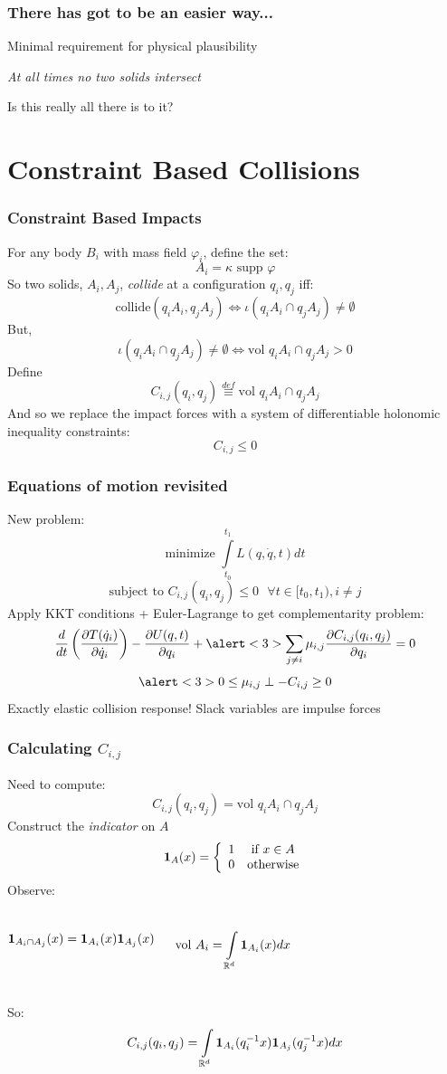 \documentclass{beamer}
\begin{document}
\begin{frame}
\frametitle{There has got to be an easier way...}
\pause
Minimal requirement for physical plausibility
\vskip7pt
\begin{center}
\emph{At all times no two solids intersect}
\end{center}
\pause
\vskip15pt
Is this really all there is to it?

\end{frame}

\section{Constraint Based Collisions}
\begin{frame}
\frametitle{Constraint Based Impacts}
For any body $B_i$ with mass field $\varphi_i$, define the set:
\[ A_i = \kappa \text{ supp } \varphi \]
\pause
So two solids, $A_i, A_j$, \emph{collide} at a configuration $q_i, q_j$ iff:
\[ \text{collide}(q_i A_i, q_j A_j) \Leftrightarrow \iota (q_i A_i \cap q_j A_j) \neq \emptyset \]
\pause
But,
\[ \iota ( q_i A_i \cap q_j A_j ) \neq \emptyset \Leftrightarrow \text{vol } q_i A_i \cap q_j A_j > 0 \]
\pause
Define
\[ C_{i,j}(q_i, q_j) \stackrel{def}{\equiv} \text{vol } q_i A_i \cap q_j A_j \]
And so we replace the impact forces with a system of differentiable holonomic inequality constraints:
\[ C_{i,j} \leq 0 \]
\end{frame}

\begin{frame}
\frametitle{Equations of motion revisited}
New problem:
\[ \text{minimize } \int \limits_{t_0}^{t_1} L(q, \dot{q}, t) dt \]
\[ \text{subject to } C_{i,j}(q_i, q_j) \leq 0 \:\:\: \forall t \in [t_0, t_1), i \neq j \]
\pause
Apply KKT conditions + Euler-Lagrange to get complementarity problem:
\[ \frac{d}{dt} \left( \frac{\partial T(\dot{q}_i)}{\partial \dot{q}_i} \right)
- \frac{\partial U(q, t)}{\partial q_i} + \alert<3>{\sum \limits_{j \neq i} \mu_{i,j} \frac{ \partial C_{i,j}(q_i, q_j)}{ \partial{q_i} }} = 0 \]
\[ \alert<3>{0 \leq \mu_{i,j} \perp -C_{i,j} \geq 0} \]
\pause
Exactly elastic collision response!
\vskip5pt
Slack variables are impulse forces
\end{frame}

\begin{frame}
\frametitle{Calculating $C_{i,j}$}
Need to compute:
\[ C_{i,j}(q_i, q_j) = \text{vol } q_i A_i \cap q_j A_j \]
\pause
Construct the \emph{indicator} on $A$
\[ {\bf 1}_{A}(x) = \left \{ \begin{array}{cc}
1 & \text{if } x \in A \\
0 & \text{otherwise}
\end{array} \right. \]
\pause
Observe:
\begin{columns}
		{\centering
		\[ {\bf 1}_{A_i \cap A_j}(x) = {\bf 1}_{A_i}(x) {\bf 1}_{A_j}(x)  \]
		}
	
		{\centering
		\[ \text{vol } A_i = \int \limits_{\mathbb{R}^d} {\bf 1}_{A_i}(x) dx \]
		}
\end{columns}
\pause
So:
\[ C_{i,j}(q_i, q_j) = \int \limits_{\mathbb{R}^d} {\bf 1}_{A_i}(q_i^{-1} x) {\bf 1}_{A_j}(q_j^{-1} x) dx \]
\end{frame}
\end{document}
